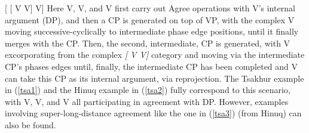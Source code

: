 \documentclass[output=paper
,modfonts
,nonflat]{langsci/langscibook}
\begin{document}
	\ea\relax\label{ex:mueller:35} {[} [ V V] V]\z
	Here V, V, and V first carry out Agree operations with V's
	internal argument (DP), and then a CP is generated on top of
	VP, with the complex V moving successive-cyclically to
	intermediate phase edge positions, until it finally merges with the
	CP. Then, the second, intermediate, CP is generated, with V
	excorporating from the complex {\itshape [ V V]} category and
	moving via the intermediate CP's phases edges until, finally, the
	intermediate CP has been completed and V can take this CP as its
	internal argument, via reprojection. The Tsakhur example in (\ref{tsa1})
	and the Hinuq example in (\ref{tsa2}) 
	fully correspond to this scenario, with V, V, and V all
	participating in agreement with DP. However, examples
	involving super-long-distance agreement like the one in 
	(\ref{tsa3}) (from Hinuq) can also be found. 
	
\end{document}
